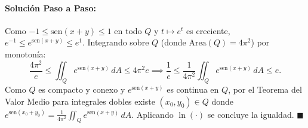 \documentclass[11pt,a4paper]{article}
\begin{document}
\paragraph{Solución Paso a Paso:}
Como $-1 \le \text{sen}(x+y) \le 1$ en todo $Q$ y $t \mapsto e^t$ es creciente, $e^{-1} \le e^{\text{sen}(x+y)} \le e^1$. Integrando sobre $Q$ (donde $\text{Area}(Q) = 4\pi^2$) por monotonía:
\[ \frac{4\pi^2}{e} \le \iint_Q e^{\text{sen}(x+y)}\,dA \le 4\pi^2 e \implies \frac{1}{e} \le \frac{1}{4\pi^2}\iint_Q e^{\text{sen}(x+y)}\,dA \le e. \]
Como $Q$ es compacto y conexo y $e^{\text{sen}(x+y)}$ es continua en $Q$, por el Teorema del Valor Medio para integrales dobles existe $(x_0,y_0)\in Q$ donde $e^{\text{sen}(x_0+y_0)} = \frac{1}{4\pi^2}\iint_Q e^{\text{sen}(x+y)}\,dA$. Aplicando $\ln(\cdot)$ se concluye la igualdad. $\blacksquare$
\end{document}
